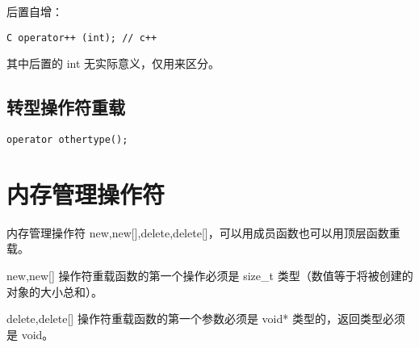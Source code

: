 后置自增：
\begin{lstlisting}[frame=shadowbox]
    C operator++ (int); // c++
\end{lstlisting}

其中后置的 int 无实际意义，仅用来区分。

\subsection{转型操作符重载}

\begin{lstlisting}[frame=shadowbox]
    operator othertype();
\end{lstlisting}

\newpage

\section{内存管理操作符}

内存管理操作符 new,new[],delete,delete[]，可以用成员函数也可以用顶层函数重载。

new,new[] 操作符重载函数的第一个操作必须是 size\_t 类型（数值等于将被创建的对象的大小总和）。

delete,delete[] 操作符重载函数的第一个参数必须是 void* 类型的，返回类型必须是 void。

\newpage